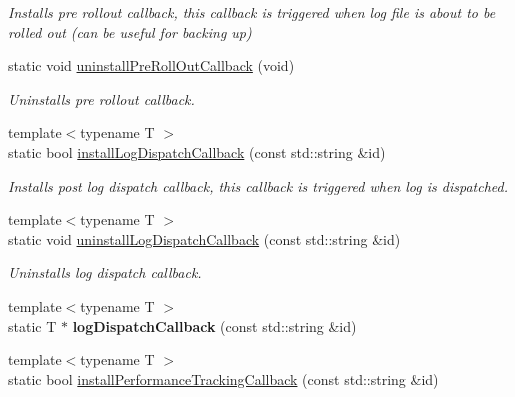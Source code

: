 \begin{DoxyCompactItemize}
\begin{DoxyCompactList}\small\item\em Installs pre rollout callback, this callback is triggered when log file is about to be rolled out (can be useful for backing up) \end{DoxyCompactList}\item 
\hypertarget{classel_1_1Helpers_ab829e5ed1b43bf965f5c288bc0280376}{static void \hyperlink{classel_1_1Helpers_ab829e5ed1b43bf965f5c288bc0280376}{uninstall\-Pre\-Roll\-Out\-Callback} (void)}\label{classel_1_1Helpers_ab829e5ed1b43bf965f5c288bc0280376}

\begin{DoxyCompactList}\small\item\em Uninstalls pre rollout callback. \end{DoxyCompactList}\item 
\hypertarget{classel_1_1Helpers_a3f3e84057567a8ac568a35899318544a}{{\footnotesize template$<$typename T $>$ }\\static bool \hyperlink{classel_1_1Helpers_a3f3e84057567a8ac568a35899318544a}{install\-Log\-Dispatch\-Callback} (const std\-::string \&id)}\label{classel_1_1Helpers_a3f3e84057567a8ac568a35899318544a}

\begin{DoxyCompactList}\small\item\em Installs post log dispatch callback, this callback is triggered when log is dispatched. \end{DoxyCompactList}\item 
\hypertarget{classel_1_1Helpers_ac94b44cc8d399a5842703126478300d7}{{\footnotesize template$<$typename T $>$ }\\static void \hyperlink{classel_1_1Helpers_ac94b44cc8d399a5842703126478300d7}{uninstall\-Log\-Dispatch\-Callback} (const std\-::string \&id)}\label{classel_1_1Helpers_ac94b44cc8d399a5842703126478300d7}

\begin{DoxyCompactList}\small\item\em Uninstalls log dispatch callback. \end{DoxyCompactList}\item 
\hypertarget{classel_1_1Helpers_aa01d59ca141bc75c4fdd78a34234611b}{{\footnotesize template$<$typename T $>$ }\\static T $\ast$ {\bfseries log\-Dispatch\-Callback} (const std\-::string \&id)}\label{classel_1_1Helpers_aa01d59ca141bc75c4fdd78a34234611b}

\item 
\hypertarget{classel_1_1Helpers_a93e2727d3a7a5c06ccc41a2ae7fe1835}{{\footnotesize template$<$typename T $>$ }\\static bool \hyperlink{classel_1_1Helpers_a93e2727d3a7a5c06ccc41a2ae7fe1835}{install\-Performance\-Tracking\-Callback} (const std\-::string \&id)}\label{classel_1_1Helpers_a93e2727d3a7a5c06ccc41a2ae7fe1835}


\end{DoxyCompactItemize}

